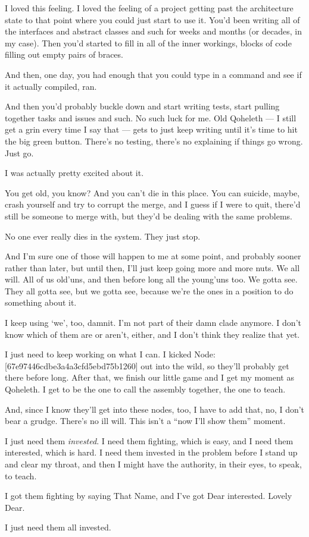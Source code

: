 I loved this feeling. I loved the feeling of a project getting past the architecture state to that point where you could just start to use it. You'd been writing all of the interfaces and abstract classes and such for weeks and months (or decades, in my case). Then you'd started to fill in all of the inner workings, blocks of code filling out empty pairs of braces.

And then, one day, you had enough that you could type in a command and see if it actually compiled, ran.

And then you'd probably buckle down and start writing tests, start pulling together tasks and issues and such. No such luck for me. Old Qoheleth --- I still get a grin every time I say that --- gets to just keep writing until it's time to hit the big green button. There's no testing, there's no explaining if things go wrong. Just go.

I was actually pretty excited about it.

You get old, you know? And you can't die in this place. You can suicide, maybe, crash yourself and try to corrupt the merge, and I guess if I were to quit, there'd still be someone to merge with, but they'd be dealing with the same problems.

No one ever really dies in the system. They just stop.

And I'm sure one of those will happen to me at some point, and probably sooner rather than later, but until then, I'll just keep going more and more nuts. We all will. All of us old'uns, and then before long all the young'uns too. We gotta see. They all gotta see, but we gotta see, because we're the ones in a position to do something about it.

I keep using `we', too, damnit. I'm not part of their damn clade anymore. I don't know which of them are or aren't, either, and I don't think they realize that yet.

I just need to keep working on what I can. I kicked Node: {[}67e97446cdbe3a4a3cfd5ebd75b1260{]} out into the wild, so they'll probably get there before long. After that, we finish our little game and I get my moment as Qoheleth. I get to be the one to call the assembly together, the one to teach.

And, since I know they'll get into these nodes, too, I have to add that, no, I don't bear a grudge. There's no ill will. This isn't a ``now I'll show them'' moment.

I just need them \emph{invested}. I need them fighting, which is easy, and I need them interested, which is hard. I need them invested in the problem before I stand up and clear my throat, and then I might have the authority, in their eyes, to speak, to teach.

I got them fighting by saying That Name, and I've got Dear interested. Lovely Dear.

I just need them all invested.
